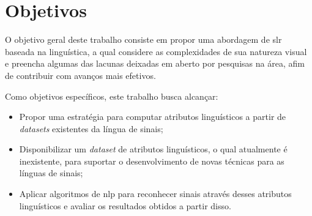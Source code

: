 \section{Objetivos}
\label{sec:introducao-objetivos}

O objetivo geral deste trabalho consiste em propor uma abordagem de \acrlong{slr} baseada na linguística, a qual considere as complexidades de sua natureza visual e preencha algumas das lacunas deixadas em aberto por pesquisas na área, afim de contribuir com avanços mais efetivos.



Como objetivos específicos, este trabalho busca alcançar:


\begin{itemize}
    \item Propor uma estratégia para computar atributos linguísticos a partir de \textit{datasets} existentes da língua de sinais;
    \item Disponibilizar um \textit{dataset} de atributos linguísticos, o qual atualmente é inexistente, para suportar o desenvolvimento de novas técnicas para as línguas de sinais;
    \item Aplicar algoritmos de \acrlong{nlp} para reconhecer sinais através desses atributos linguísticos e avaliar os resultados obtidos a partir disso.
\end{itemize}


